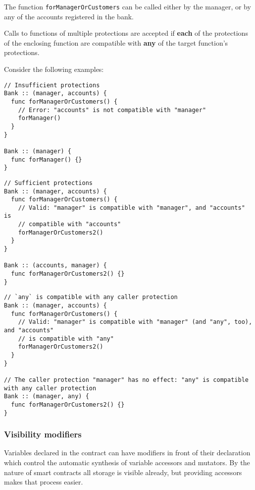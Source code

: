 The function \texttt{forManagerOrCustomers} can be called either by the manager, or by any of the accounts registered in the bank.

Calls to functions of multiple protections are accepted if \textbf{each} of the protections of the enclosing function are compatible with \textbf{any} of the target function's protections.

Consider the following examples:

\begin{verbatim}
// Insufficient protections
Bank :: (manager, accounts) {
  func forManagerOrCustomers() {
    // Error: "accounts" is not compatible with "manager"
    forManager()
  }
}

Bank :: (manager) {
  func forManager() {}
}
\end{verbatim}

\begin{verbatim}
// Sufficient protections
Bank :: (manager, accounts) {
  func forManagerOrCustomers() {
    // Valid: "manager" is compatible with "manager", and "accounts" is
    // compatible with "accounts"
    forManagerOrCustomers2()
  }
}

Bank :: (accounts, manager) {
  func forManagerOrCustomers2() {}
}
\end{verbatim}

\begin{verbatim}
// `any` is compatible with any caller protection
Bank :: (manager, accounts) {
  func forManagerOrCustomers() {
    // Valid: "manager" is compatible with "manager" (and "any", too), and "accounts"
    // is compatible with "any"
    forManagerOrCustomers2()
  }
}

// The caller protection "manager" has no effect: "any" is compatible with any caller protection
Bank :: (manager, any) {
  func forManagerOrCustomers2() {}
}
\end{verbatim}

\subsubsection{Visibility modifiers}
\label{sec:appendix-b-visibility-modifiers}

Variables declared in the contract can have modifiers in front of their declaration which control the automatic synthesis of variable accessors and mutators. By the nature of smart contracts all storage is visible already, but providing accessors makes that process easier.

